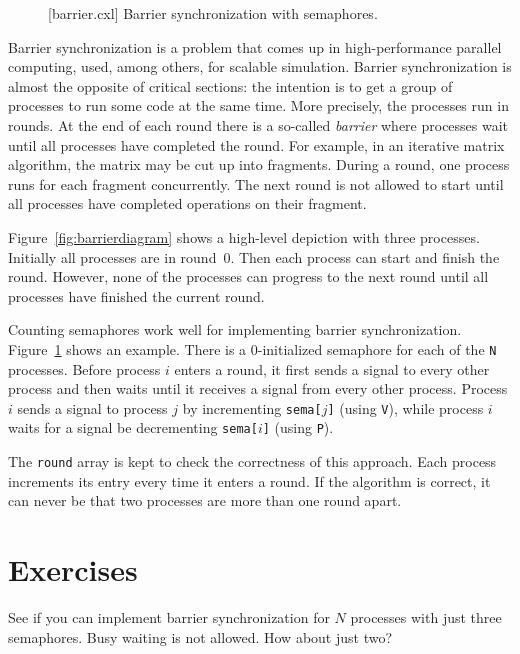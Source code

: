 \documentclass{report}
\newenvironment{code}{
\tcolorbox
}{
\endtcolorbox
}
\begin{document}
\begin{figure}
\begin{code}
\end{code}
\caption{[barrier.cxl] Barrier synchronization with semaphores.}
\label{fig:barrier}
\end{figure}

Barrier synchronization is a problem that comes up in high-performance
parallel computing, used, among others, for scalable simulation.
Barrier synchronization is almost the opposite of critical sections:
the intention is to get a group of processes to run some code at the
same time.
More precisely, the processes run in rounds.  At the end of each round
there is a so-called \emph{barrier} where processes wait until all
processes have completed the round.
For example, in an iterative matrix algorithm, the matrix may be
cut up into fragments.  During a round, one process runs for each
fragment concurrently.  The next round is not allowed to start
until all processes have completed operations on their fragment.

Figure~\ref{fig:barrierdiagram} shows a high-level depiction with three
processes.  Initially all processes are in round~0.  Then each process
can start and finish the round.  However, none of the processes can
progress to the next round until all processes have finished the
current round.

Counting semaphores work well for implementing barrier synchronization.
Figure~\ref{fig:barrier} shows an example.  There is a 0-initialized
semaphore for each of the \texttt{N} processes.
Before process $i$ enters a round, it first sends a signal to every
other process and then waits until it receives a signal from
every other process.  Process $i$ sends a signal to process $j$
by incrementing \texttt{sema[$j$]} (using \texttt{V}),
while process $i$ waits for a signal be decrementing \texttt{sema[$i$]}
(using \texttt{P}).

The \texttt{round} array is kept to check the correctness of this
approach.  Each process increments its entry every time it enters
a round.  If the algorithm is correct, it can never be that two processes
are more than one round apart.

\section*{Exercises}
\begin{problems}
\item See if you can implement barrier synchronization for $N$ processes
with just three semaphores.  Busy waiting is not allowed.  How about just two?
\end{problems}
\end{document}
